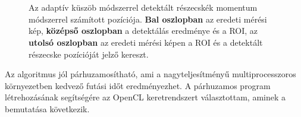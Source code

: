 	\begin{figure}[H]
		\centering
		\\
		\\
		\caption[Pozíciómérés momentum módszerrel]{Az adaptív küszöb módszerrel detektált részecskék
		momentum módszerrel számított pozíciója. \textbf{Bal oszlopban} az eredeti mérési kép, \textbf{középső oszlopban} a detektálás
		eredménye és a ROI, az \textbf{utolsó oszlopban} az eredeti mérési képen a ROI és a detektált
		részecske pozícióját jelző kereszt.}
		\label{fig:roi}
	\end{figure}
	
	\noindent
	\begin{center}
	Az algoritmus jól párhuzamosítható, ami a nagyteljesítményű multiprocesszoros
	környezetben kedvező futási időt eredményezhet. A párhuzamos program létrehozásának segítségére az 
	OpenCL keretrendszert választottam, aminek a bemutatása következik.
	\end{center}





